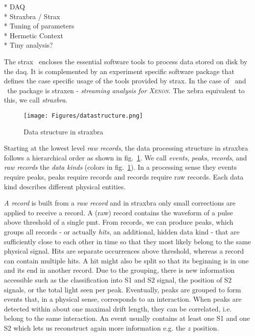 * DAQ \\
* Straxbra / Strax \\
* Tuning of parameters \\
* Hermetic Context \\
* Tiny analysis?



The \gls{strax}~\cite{strax} encloses the essential software tools to process data stored on disk by the \gls{daq}.  %
It is complemented by an experiment specific software package that defines the case specific usage of the tools provided by strax.
In the case of \oneton~and \nton~the package is straxen - \emph{streaming analysis for \textsc{Xenon}}.  %
The \gls{xebra} equivalent to this, we call \emph{straxbra}.  %

\begin{figure}
\centering
\texttt{[image: Figures/datastructure.png]}  %
\caption[Data structure in straxbra]{
    Data structure in straxbra
    }
\label{fig:data-structure}
\end{figure}


Starting at the lowest level \emph{raw records}, the data processing structure in straxbra follows a hierarchical order as shown in fig.~\ref{fig:data-structure}.
We call \emph{events}, \emph{peaks}, \emph{records}, and \emph{raw records} the \emph{data kinds} (colors in fig.~\ref{fig:data-structure}).
In a processing sense they events require peaks, peaks require records and records require raw records.
Each data kind describes different physical entities.

\emph{A record} is built from a \emph{raw record} and in straxbra only small corrections are applied to receive a record.
A (raw) record contains the waveform of a pulse above threshold of a single \gls{pmt}.
From records, we can produce peaks, which groups all records - or actually \emph{hits}, an additional, hidden data kind - that are sufficiently close to each other in time so that they most likely belong to the same physical signal.
Hits are separate occurrences above threshold, whereas a record can contain multiple hits.
A hit might also  be split so that its beginning is in one and its end in another record.
Due to the grouping, there is new information accessible such as the classification into S1 and S2 signal, the position of S2 signals, or the total light seen per peak.
Eventually, peaks are grouped to form events that, in a physical sense, corresponds to an interaction.
When peaks are detected within about one maximal drift length, they can be correlated, i.e. belong to the same interaction.
An event usually contains at least one S1 and one S2 which lets us reconstruct again more information e.g. the $ z $ position.

